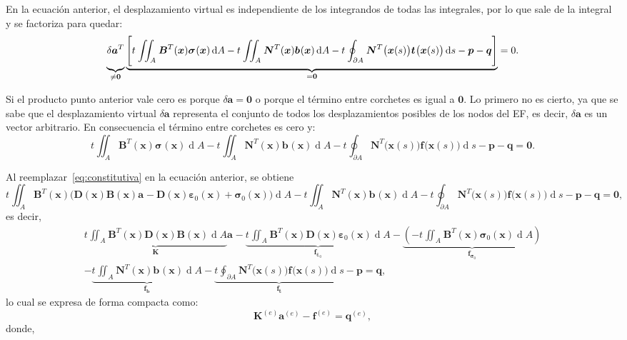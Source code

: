 \documentclass[12pt,letterpaper, landscape]{article}
\newcommand{\e}{{}}
\newcommand{\ve}[1]{{\boldsymbol{#1}}}
\newcommand{\ma}[1]{{\boldsymbol{#1}}}
\newcommand{\dd}{\operatorname{d} \!}
\begin{document}
En la ecuación anterior, el desplazamiento virtual es independiente de los integrandos de todas las integrales, por lo que sale de la integral y se factoriza para quedar:
\begin{equation}
\underbrace{\vphantom{\Bigg[}\delta\ve{a}^T}_{\neq\ve{0}} \underbrace{\Bigg[ t^\e \iint_{A^\e} \ma{B}^T(\ve{x}) \ve{\sigma}^\e(\ve{x}) \dd A - t^\e \iint_{A^\e}  \ma{N}^T(\ve{x}) \ve{b}^\e(\ve{x}) \dd A - t^\e \oint_{\partial A^\e} \ma{N}^T\big(\ve{x}(s)\big) \ve{t}^\e\big(\ve{x}(s)\big) \dd s - \ve{p} - \ve{q} \Bigg]}_{=\ve{0}}= 0. \label{eq:PTV3}
\end{equation}

Si el producto punto anterior vale cero es porque $\delta\ve{a} = \ve{0}$ o porque el término entre corchetes es igual a $\ve{0}$. Lo primero no es cierto, ya que se sabe que el desplazamiento virtual $\delta \ve{a}$ representa el conjunto de todos los desplazamientos posibles de los nodos del EF, es decir, $\delta\ve{a}$ es un vector arbitrario. En consecuencia el término entre corchetes es cero y:
\begin{equation}
 t^\e \iint_{A^\e}  \ma{B}^T(\ve{x})  \ve{\sigma}^\e(\ve{x}) \dd A - t^\e \iint_{A^\e}  \ma{N}^T(\ve{x}) \ve{b}^\e(\ve{x}) \dd A -  t^\e \oint_{\partial A^\e} \ma{N}^T\big(\ve{x}(s)\big) \ve{f}^\e\big(\ve{x}(s)\big) \dd s -  \ve{p} - \ve{q} = \ve{0}.
\end{equation}

Al reemplazar~\eqref{eq:constitutiva} en la ecuación anterior, se obtiene
\begin{equation}
t^\e \iint_{A^\e}  \ma{B}^T(\ve{x}) \big(\ma{D}(\ve{x})\ma{B}(\ve{x})\ve{a}^\e - \ma{D}(\ve{x})\ve{\varepsilon}_0(\ve{x}) + \ve{\sigma}_0(\ve{x})\big) \dd A 
- t^\e \iint_{A^\e}  \ma{N}^T(\ve{x}) \ve{b}^\e(\ve{x}) \dd A -  t^\e \oint_{\partial A^\e} \ma{N}^T\big(\ve{x}(s)\big) \ve{f}^\e\big(\ve{x}(s)\big) \dd s -  \ve{p} - \ve{q} = \ve{0},
\end{equation}
es decir,
\begin{multline}
\underbrace{t^\e \iint_{A^\e}  \ma{B}^T(\ve{x})\ma{D}(\ve{x})\ma{B}(\ve{x}) \dd A}_{\ma{K}} \ve{a}^\e
% 
- \underbrace{t^\e \iint_{A^\e}  \ma{B}^T(\ve{x})\ma{D}(\ve{x})\ve{\varepsilon}_0(\ve{x}) \dd A}_{\ve{f}_{\ve{\varepsilon}_0}} 
%
- \underbrace{\left(-t^\e \iint_{A^\e}  \ma{B}^T(\ve{x})\ve{\sigma}_0(\ve{x}) \dd A \right)}_{\ve{f}_{\ve{\sigma}_0}} \\
%
- \underbrace{t^\e \iint_{A^\e}  \ma{N}^T(\ve{x}) \ve{b}^\e(\ve{x}) \dd A}_{\ve{f}_\ve{b}}
%
- \underbrace{t^\e \oint_{\partial A^\e} \ma{N}^T\big(\ve{x}(s)\big) \ve{f}^\e\big(\ve{x}(s)\big) \dd s}_{\ve{f}_\ve{t}} 
%
- \ve{p} = \ve{q},
\end{multline}
lo cual se expresa de forma compacta como:
\begin{equation}
\ma{K}^{(e)} \ve{a}^{(e)} - \ma{f}^{(e)} = \ma{q}^{(e)},
\end{equation}
donde,
\end{document}
